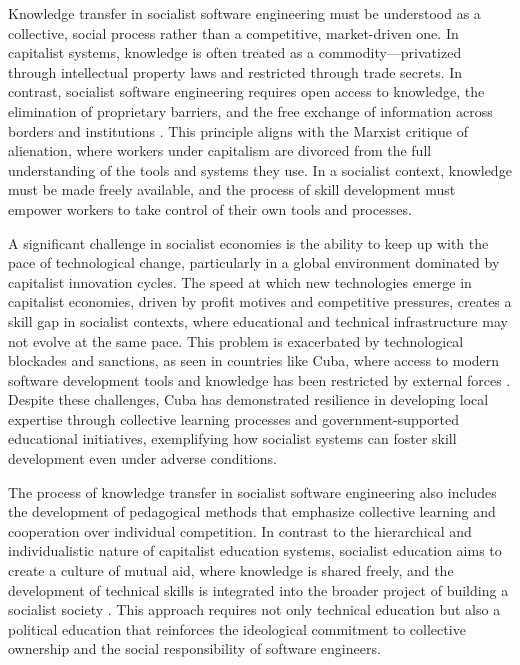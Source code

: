 \begin{refsection}
Knowledge transfer in socialist software engineering must be understood as a collective, social process rather than a competitive, market-driven one. In capitalist systems, knowledge is often treated as a commodity—privatized through intellectual property laws and restricted through trade secrets. In contrast, socialist software engineering requires open access to knowledge, the elimination of proprietary barriers, and the free exchange of information across borders and institutions \cite[pp.~67-70]{stallman}. This principle aligns with the Marxist critique of alienation, where workers under capitalism are divorced from the full understanding of the tools and systems they use. In a socialist context, knowledge must be made freely available, and the process of skill development must empower workers to take control of their own tools and processes.

A significant challenge in socialist economies is the ability to keep up with the pace of technological change, particularly in a global environment dominated by capitalist innovation cycles. The speed at which new technologies emerge in capitalist economies, driven by profit motives and competitive pressures, creates a skill gap in socialist contexts, where educational and technical infrastructure may not evolve at the same pace. This problem is exacerbated by technological blockades and sanctions, as seen in countries like Cuba, where access to modern software development tools and knowledge has been restricted by external forces \cite[pp.~73-75]{ernesto}. Despite these challenges, Cuba has demonstrated resilience in developing local expertise through collective learning processes and government-supported educational initiatives, exemplifying how socialist systems can foster skill development even under adverse conditions.

The process of knowledge transfer in socialist software engineering also includes the development of pedagogical methods that emphasize collective learning and cooperation over individual competition. In contrast to the hierarchical and individualistic nature of capitalist education systems, socialist education aims to create a culture of mutual aid, where knowledge is shared freely, and the development of technical skills is integrated into the broader project of building a socialist society \cite[pp.~12-15]{freire}. This approach requires not only technical education but also a political education that reinforces the ideological commitment to collective ownership and the social responsibility of software engineers.


\end{refsection}
